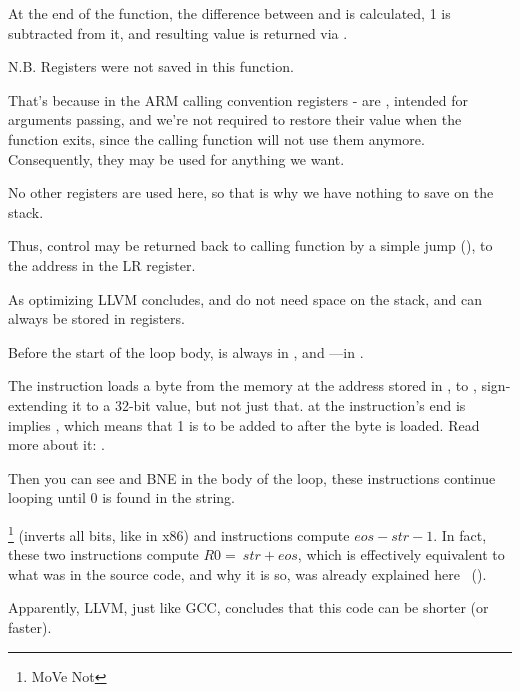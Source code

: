 At the end of the function, the difference between 
 and  is calculated, 1 is subtracted from it, and resulting value is returned
via .

N.B. Registers were not saved in this function.

That's because in the ARM calling convention registers - are , 
intended for arguments passing,
and we're not required to restore their value when the function exits, 
since the calling function will not use them anymore.
Consequently, they may be used for anything we want.

No other registers are used here, so that is why we have nothing to save on the stack.

Thus, control may be returned back to calling function by a simple jump (),
to the address in the \ac{LR} register.

\mysubparagraph{\OptimizingXcodeIV (\ThumbMode)}



As optimizing LLVM concludes,  and  do not need space on the stack, and can always be stored in registers.

Before the start of the loop body,  is always in , 
and ---in .

The  instruction loads a byte from the memory at the address stored in , to , sign-extending it to a 32-bit value, but not just that.
 at the instruction's end is implies , which means that 1 is to be added to  after the byte is loaded.
Read more about it: .

Then you can see \CMP and \ac{BNE} in the body of the loop, these instructions continue looping until 0 is found in the string.

\footnote{MoVe Not} (inverts all bits, like \NOT in x86) and \ADD instructions compute $eos - str - 1$.
In fact, these two instructions compute $R0 = ~str + eos$, 
which is effectively equivalent to what was in the source code, and why it is so, was already explained here
~().

Apparently, LLVM, just like GCC, concludes that this code can be shorter (or faster).

